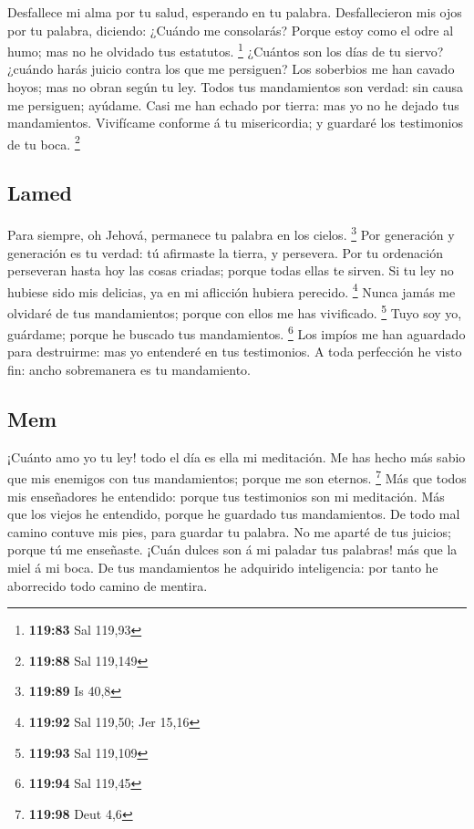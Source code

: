  Desfallece mi alma por tu salud, esperando en tu palabra.
 Desfallecieron mis ojos por tu palabra, diciendo: ¿Cuándo
me consolarás?  Porque estoy como el odre al humo; mas no
he olvidado tus estatutos. \footnote{\textbf{119:83} Sal 119,93}
 ¿Cuántos son los días de tu siervo? ¿cuándo harás juicio
contra los que me persiguen?  Los soberbios me han cavado
hoyos; mas no obran según tu ley.  Todos tus mandamientos
son verdad: sin causa me persiguen; ayúdame.  Casi me han
echado por tierra: mas yo no he dejado tus mandamientos. 
Vivifícame conforme á tu misericordia; y guardaré los testimonios de tu
boca. \footnote{\textbf{119:88} Sal 119,149}

\hypertarget{lamed}{%
\subsection{Lamed}\label{lamed}}

 Para siempre, oh Jehová, permanece tu palabra en los
cielos. \footnote{\textbf{119:89} Is 40,8}  Por generación
y generación es tu verdad: tú afirmaste la tierra, y persevera.
 Por tu ordenación perseveran hasta hoy las cosas criadas;
porque todas ellas te sirven.  Si tu ley no hubiese sido
mis delicias, ya en mi aflicción hubiera perecido. \footnote{\textbf{119:92}
  Sal 119,50; Jer 15,16}  Nunca jamás me olvidaré de tus
mandamientos; porque con ellos me has vivificado. \footnote{\textbf{119:93}
  Sal 119,109}  Tuyo soy yo, guárdame; porque he buscado
tus mandamientos. \footnote{\textbf{119:94} Sal 119,45} 
Los impíos me han aguardado para destruirme: mas yo entenderé en tus
testimonios.  A toda perfección he visto fin: ancho
sobremanera es tu mandamiento.

\hypertarget{mem}{%
\subsection{Mem}\label{mem}}

 ¡Cuánto amo yo tu ley! todo el día es ella mi meditación.
 Me has hecho más sabio que mis enemigos con tus
mandamientos; porque me son eternos. \footnote{\textbf{119:98} Deut 4,6}
 Más que todos mis enseñadores he entendido: porque tus
testimonios son mi meditación.  Más que los viejos he
entendido, porque he guardado tus mandamientos.  De todo
mal camino contuve mis pies, para guardar tu palabra.  No
me aparté de tus juicios; porque tú me enseñaste.  ¡Cuán
dulces son á mi paladar tus palabras! más que la miel á mi boca.
 De tus mandamientos he adquirido inteligencia: por tanto
he aborrecido todo camino de mentira.

